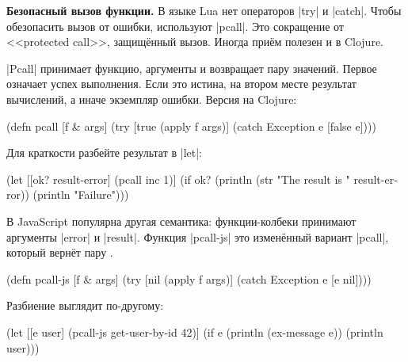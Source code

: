 \textbf{Безопасный вызов функции.} В языке Lua нет операторов \spverb|try| и
\spverb|catch|. Чтобы обезопасить вызов от ошибки, используют
\spverb|pcall|. Это сокращение от
<<protected call>>, защищ\"{е}нный вызов. Иногда при\"{е}м полезен и в Clojure.

\spverb|Pcall| принимает функцию, аргументы и возвращает пару значений. Первое
означает успех выполнения. Если это истина, на втором месте результат
вычислений, а иначе экземпляр ошибки. Версия на Clojure:


\begin{english}
  \begin{clojure}
(defn pcall [f & args]
  (try
    [true (apply f args)]
    (catch Exception e [false e])))
  \end{clojure}
\end{english}

\noindent
Для краткости разбейте результат в \spverb|let|:

\begin{english}
  \begin{clojure}
(let [[ok? result-error] (pcall inc 1)]
  (if ok?
    (println (str "The result is " result-error))
    (println "Failure")))
  \end{clojure}
\end{english}


В JavaScript популярна другая семантика: функции-колбеки принимают аргументы
\spverb|error| и \spverb|result|. Функция \spverb|pcall-js| это измен\"{е}нный
вариант \spverb|pcall|, который верн\"{е}т пару .

\begin{english}
  \begin{clojure}
(defn pcall-js [f & args]
  (try
    [nil (apply f args)]
    (catch Exception e [e nil])))
  \end{clojure}
\end{english}

\noindent
Разбиение выглядит по-другому:

\begin{english}
  \begin{clojure}
(let [[e user] (pcall-js get-user-by-id 42)]
  (if e
    (println (ex-message e))
    (println user)))
  \end{clojure}
\end{english}

